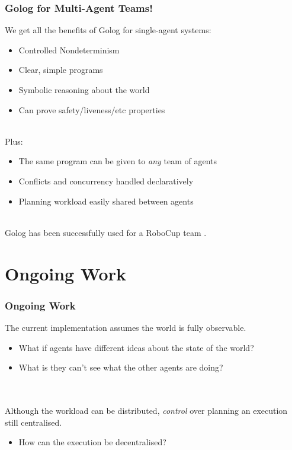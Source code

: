 \documentclass{beamer}
\begin{document}
\begin{frame}
\frametitle{Golog for Multi-Agent Teams!}
We get all the benefits of Golog for single-agent systems:
\begin{itemize}
  \item Controlled Nondeterminism
  \item Clear, simple programs
  \item Symbolic reasoning about the world
  \item Can prove safety/liveness/etc properties
\end{itemize}
\ \\
\pause
Plus:
\begin{itemize}
  \item The same program can be given to \emph{any} team of agents
  \item Conflicts and concurrency handled declaratively
  \item Planning workload easily shared between agents
\end{itemize}
\ \\
\pause
Golog has been successfully used for a RoboCup team \cite{Ferrein2005readylog}.
\end{frame}


\section{Ongoing Work}

\begin{frame}
\frametitle{Ongoing Work}

The current implementation assumes the world is fully observable.
\begin{itemize}
  \item What if agents have different ideas about the state of the world?
  \item What is they can't see what the other agents are doing?
\end{itemize}
\ \\
\ \\
Although the workload can be distributed, \emph{control} over planning 
an execution still centralised.

\begin{itemize}
  \item How can the execution be decentralised?
\end{itemize}
\end{frame}
\end{document}
